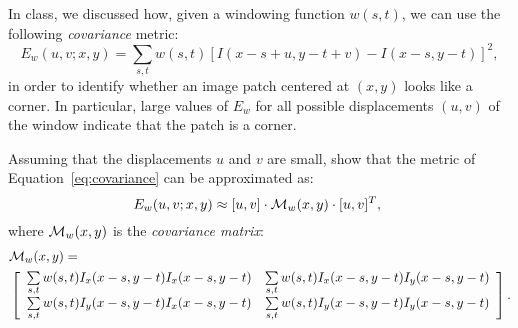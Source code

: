 \begin{problem}
  In class, we discussed how, given a windowing function $w(s,t)$,
  we can use the following \emph{covariance} metric:
\begin{equation}\label{eq:covariance}
  E_w(u,v;x,y) = \sum_{s,t} w(s,t) \left[I(x-s+u,y-t+v) - I(x-s,y-t)\right]^2,
\end{equation}
in order to identify whether an image patch centered at $(x,y)$ looks like a corner.
In particular, large values of $E_w$ for all possible displacements
$(u,v)$ of the window indicate that the patch is a corner.

\step
Assuming that the displacements $u$ and $v$ are small,
show that the metric of Equation~\eqref{eq:covariance} can be approximated as:
\begin{equation}
  E_w(u,v; x, y) \approx [u, v] \cdot {\mathcal{M}}_w(x,y) \cdot [u, v]^T,~\label{eq:approx}
\end{equation}
where ${\mathcal{M}}_w(x,y)$ is the \emph{covariance matrix}:
\begin{align}
&{\mathcal{M}}_w(x,y)=\nonumber\\
&\left[\begin{array}{cc} \sum\limits_{s,t} w(s,t)I_x(x-s,y-t)I_x(x-s,y-t)
& \sum\limits_{s,t} w(s,t)I_x(x-s,y-t)I_y(x-s,y-t)\\
\sum\limits_{s,t} w(s,t)I_y(x-s,y-t)I_x(x-s,y-t) &
\sum\limits_{s,t} w(s,t)I_y(x-s,y-t)I_y(x-s,y-t)
\end{array}\right].
\end{align}
\end{problem}
